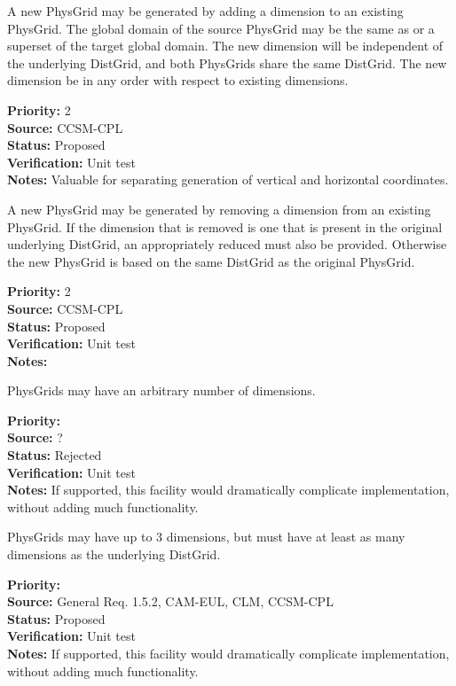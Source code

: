 A new PhysGrid may be generated by adding a dimension to an existing PhysGrid.
The global domain of the source PhysGrid may be the same as or a superset of
the target global domain.  The new dimension will be independent of the underlying
DistGrid, and both PhysGrids share the same DistGrid.  The new dimension be in any
order with respect to existing dimensions.
\begin{reqlist}
{\bf Priority:} 2 \\
{\bf Source:} CCSM-CPL \\
{\bf Status:} Proposed \\
{\bf Verification:} Unit test\\
{\bf Notes:} Valuable for separating generation of vertical and horizontal
coordinates.
\end{reqlist}

A new PhysGrid may be generated by removing a dimension from an existing PhysGrid.
If the dimension that is removed is one that is present in the original underlying
DistGrid, an appropriately reduced must also be provided.  Otherwise the new PhysGrid
is based on the same DistGrid as the original PhysGrid.
\begin{reqlist}
{\bf Priority:} 2 \\
{\bf Source:} CCSM-CPL \\
{\bf Status:} Proposed \\
{\bf Verification:} Unit test\\
{\bf Notes:} 
\end{reqlist}

PhysGrids may have an arbitrary number of dimensions. 
\begin{reqlist}
{\bf Priority:} \\
{\bf Source:} ? \\
{\bf Status:} Rejected\\
{\bf Verification:} Unit test\\
{\bf Notes:} If supported, this facility would dramatically complicate implementation,
without adding much functionality.
\end{reqlist}

PhysGrids may have up to 3 dimensions, but must have at least as many dimensions as the
underlying DistGrid. 
\begin{reqlist}
{\bf Priority:}  \\
{\bf Source:} General Req. 1.5.2, CAM-EUL, CLM, CCSM-CPL \\
{\bf Status:} Proposed \\
{\bf Verification:} Unit test\\
{\bf Notes:} If supported, this facility would dramatically complicate implementation,
without adding much functionality.
\end{reqlist}

